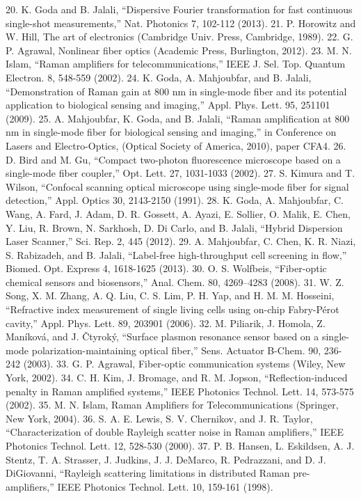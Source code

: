 20.	K. Goda and B. Jalali, “Dispersive Fourier transformation for fast continuous single-shot measurements,” Nat. Photonics 7, 102-112 (2013).
21.	P. Horowitz and W. Hill, The art of electronics (Cambridge Univ. Press, Cambridge, 1989).
22.	G. P. Agrawal, Nonlinear fiber optics (Academic Press, Burlington, 2012).
23.	M. N. Islam, “Raman amplifiers for telecommunications,” IEEE J. Sel. Top. Quantum Electron. 8, 548-559 (2002).
24.	K. Goda, A. Mahjoubfar, and B. Jalali, “Demonstration of Raman gain at 800 nm in single-mode fiber and its potential application to biological sensing and imaging,” Appl. Phys. Lett. 95, 251101 (2009).
25.	A. Mahjoubfar, K. Goda, and B. Jalali, “Raman amplification at 800 nm in single-mode fiber for biological sensing and imaging,” in Conference on Lasers and Electro-Optics, (Optical Society of America, 2010), paper CFA4.
26.	D. Bird and M. Gu, “Compact two-photon fluorescence microscope based on a single-mode fiber coupler,” Opt. Lett. 27, 1031-1033 (2002).
27.	S. Kimura and T. Wilson, “Confocal scanning optical microscope using single-mode fiber for signal detection,” Appl. Optics 30, 2143-2150 (1991).
28.	K. Goda, A. Mahjoubfar, C. Wang, A. Fard, J. Adam, D. R. Gossett, A. Ayazi, E. Sollier, O. Malik, E. Chen, Y. Liu, R. Brown, N. Sarkhosh, D. Di Carlo, and B. Jalali, “Hybrid Dispersion Laser Scanner,” Sci. Rep. 2, 445 (2012).
29.	A. Mahjoubfar, C. Chen, K. R. Niazi, S. Rabizadeh, and B. Jalali, “Label-free high-throughput cell screening in flow,” Biomed. Opt. Express 4, 1618-1625 (2013).
30.	O. S. Wolfbeis, “Fiber-optic chemical sensors and biosensors,” Anal. Chem. 80, 4269–4283 (2008).
31.	W. Z. Song, X. M. Zhang, A. Q. Liu, C. S. Lim, P. H. Yap, and H. M. M. Hosseini, “Refractive index measurement of single living cells using on-chip Fabry-Pérot cavity,” Appl. Phys. Lett. 89, 203901 (2006).
32.	M. Piliarik, J. Homola, Z. Maníková, and J. Čtyroký, “Surface plasmon resonance sensor based on a single-mode polarization-maintaining optical fiber,” Sens. Actuator B-Chem. 90, 236-242 (2003).
33.	G. P. Agrawal, Fiber-optic communication systems (Wiley, New York, 2002).
34.	C. H. Kim, J. Bromage, and R. M. Jopson, “Reflection-induced penalty in Raman amplified systems,” IEEE Photonics Technol. Lett. 14, 573-575 (2002).
35.	M. N. Islam, Raman Amplifiers for Telecommunications (Springer, New York, 2004).
36.	S. A. E. Lewis, S. V. Chernikov, and J. R. Taylor, “Characterization of double Rayleigh scatter noise in Raman amplifiers,” IEEE Photonics Technol. Lett. 12, 528-530 (2000).
37.	P. B. Hansen, L. Eskildsen, A. J. Stentz, T. A. Strasser, J. Judkins, J. J. DeMarco, R. Pedrazzani, and D. J. DiGiovanni, “Rayleigh scattering limitations in distributed Raman pre-amplifiers,” IEEE Photonics Technol. Lett. 10, 159-161 (1998).
